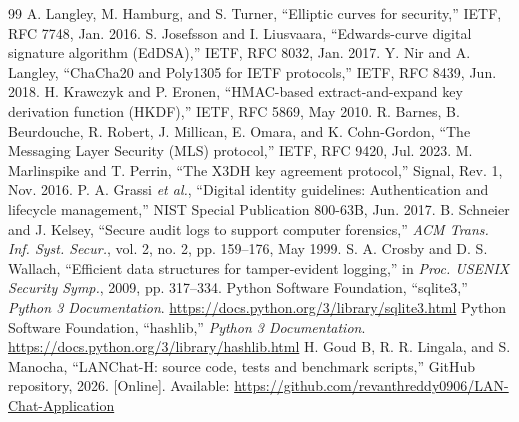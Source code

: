 \documentclass[conference]{IEEEtran}
\begin{document}
\begin{thebibliography}{99}
 A. Langley, M. Hamburg, and S. Turner, ``Elliptic curves for security,'' IETF, RFC 7748, Jan. 2016.
 S. Josefsson and I. Liusvaara, ``Edwards-curve digital signature algorithm (EdDSA),'' IETF, RFC 8032, Jan. 2017.
 Y. Nir and A. Langley, ``ChaCha20 and Poly1305 for IETF protocols,'' IETF, RFC 8439, Jun. 2018.
 H. Krawczyk and P. Eronen, ``HMAC-based extract-and-expand key derivation function (HKDF),'' IETF, RFC 5869, May 2010.
 R. Barnes, B. Beurdouche, R. Robert, J. Millican, E. Omara, and K. Cohn-Gordon, ``The Messaging Layer Security (MLS) protocol,'' IETF, RFC 9420, Jul. 2023.
 M. Marlinspike and T. Perrin, ``The X3DH key agreement protocol,'' Signal, Rev. 1, Nov. 2016.
 P. A. Grassi \emph{et al.}, ``Digital identity guidelines: Authentication and lifecycle management,'' NIST Special Publication 800-63B, Jun. 2017.
 B. Schneier and J. Kelsey, ``Secure audit logs to support computer forensics,'' \emph{ACM Trans. Inf. Syst. Secur.}, vol. 2, no. 2, pp. 159--176, May 1999.
 S. A. Crosby and D. S. Wallach, ``Efficient data structures for tamper-evident logging,'' in \emph{Proc. USENIX Security Symp.}, 2009, pp. 317--334.
 Python Software Foundation, ``sqlite3,'' \emph{Python 3 Documentation}. \url{https://docs.python.org/3/library/sqlite3.html}
 Python Software Foundation, ``hashlib,'' \emph{Python 3 Documentation}. \url{https://docs.python.org/3/library/hashlib.html}
 H. Goud B, R. R. Lingala, and S. Manocha, ``LANChat-H: source code, tests and benchmark scripts,'' GitHub repository, 2026. [Online]. Available: \url{https://github.com/revanthreddy0906/LAN-Chat-Application}

\end{thebibliography}
\end{document}
